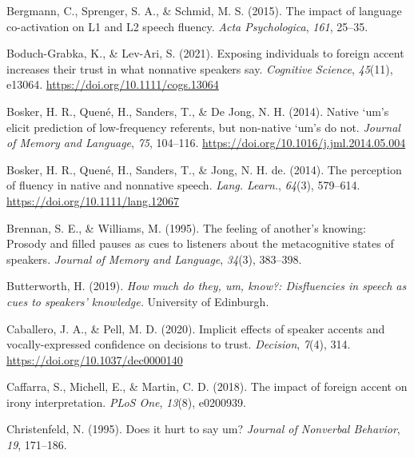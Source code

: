 \documentclass[
  man,floatsintext]{apa7}
\newlength{\cslhangindent}
\newlength{\cslentryspacingunit} %
\newenvironment{CSLReferences}[2] %
 {%
  \setlength{\parindent}{0pt}
  \ifodd #1
  \let\oldpar\par
  \def\par{\hangindent=\cslhangindent\oldpar}
  \fi
  \setlength{\parskip}{#2\cslentryspacingunit}
 }%
 {}
\begin{document}
\begin{CSLReferences}{1}{0}
\leavevmode{}%
Bergmann, C., Sprenger, S. A., \& Schmid, M. S. (2015). The impact of language co-activation on {L1} and {L2} speech fluency. \emph{Acta {Psychologica}}, \emph{161}, 25--35.

\leavevmode{}%
Boduch-Grabka, K., \& Lev-Ari, S. (2021). Exposing individuals to foreign accent increases their trust in what nonnative speakers say. \emph{Cognitive Science}, \emph{45}(11), e13064. \url{https://doi.org/10.1111/cogs.13064}

\leavevmode{}%
Bosker, H. R., Quené, H., Sanders, T., \& De Jong, N. H. (2014). Native `um's elicit prediction of low-frequency referents, but non-native `um's do not. \emph{Journal of Memory and Language}, \emph{75}, 104--116. \url{https://doi.org/10.1016/j.jml.2014.05.004}

\leavevmode{}%
Bosker, H. R., Quené, H., Sanders, T., \& Jong, N. H. de. (2014). The perception of fluency in native and nonnative speech. \emph{Lang. Learn.}, \emph{64}(3), 579--614. \url{https://doi.org/10.1111/lang.12067}

\leavevmode{}%
Brennan, S. E., \& Williams, M. (1995). The feeling of another's knowing: Prosody and filled pauses as cues to listeners about the metacognitive states of speakers. \emph{Journal of Memory and Language}, \emph{34}(3), 383--398.

\leavevmode{}%
Butterworth, H. (2019). \emph{How much do they, um, know?: Disfluencies in speech as cues to speakers' knowledge.} University of Edinburgh.

\leavevmode{}%
Caballero, J. A., \& Pell, M. D. (2020). Implicit effects of speaker accents and vocally-expressed confidence on decisions to trust. \emph{Decision}, \emph{7}(4), 314. \url{https://doi.org/10.1037/dec0000140}

\leavevmode{}%
Caffarra, S., Michell, E., \& Martin, C. D. (2018). The impact of foreign accent on irony interpretation. \emph{{PLoS} One}, \emph{13}(8), e0200939.

\leavevmode{}%
Christenfeld, N. (1995). Does it hurt to say um? \emph{Journal of Nonverbal Behavior}, \emph{19}, 171--186.


\end{CSLReferences}
\end{document}
